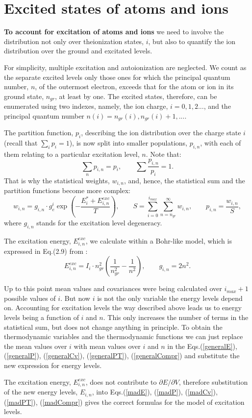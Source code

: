 \section{Excited states of atoms and ions}
{\bf To account for excitation of atoms and ions} we need to involve the
distribution not only over theionization states, $i$, but also to quantify the
ion distribution over the ground and 
excitated levels. 

For simplicity,  multiple excitation and autoionization are neglected. We
count as the separate excited levels only those ones for which the principal 
quantum number, 
$n$, of the outermost electron, exceeds that for the atom or ion in its ground state, 
$n_{gr}$, at least by one. The excited states, therefore, can be enumerated using two indexes,
namely, the ion charge, $i=0,1,2...$, and the principal quantum number 
$n(i)=n_{gr}(i),n_{gr}(i)+1,...$. 

The partition function, $p_i$, describing the ion distribution over the charge state $i$ 
(recall that $\sum_i{p_i}=1$), 
is now split into smaller populations, $p_{i,n}$, with each of them relating to a particular 
excitation level, $n$. Note that:
\begin{equation}
\sum_n{p_{i,n}}=p_i,\qquad \sum{\frac{p_{i,n}}{p_i}}=1.	
\end{equation}
That is why the statistical weights, $w_{i,n}$, and, hence, the statistical sum and the partition functions
become more complex:
\begin{equation}
w_{i,n} = g_{i,n} \cdot g_e^i \exp \left( -\frac{E^*_i + E^{exc}_{i,n}}{T} \right),\qquad
S = \sum_{i=0}^{i_{max}} \sum_{n=n_{gr}}^{\infty} w_{i,n},\qquad
p_{i,n} = \frac{w_{i,n}}{S},
\end{equation}
where $g_{i,n}$ stands for the excitation level degeneracy.

The excitation energy, $E^{exc}_{i,n}$, we calculate within a Bohr-like model, which is expressed in
Eq.(2.9) from \cite{ionmix}:
\begin{equation}
E^{exc}_{i,n} = I_i \cdot n_{gr}^2 \left( \frac1{n_{gr}^2} - \frac1{n^2} \right), \qquad
g_{i,n} = 2 n^2.
\end{equation}

Up to this point mean values and covariances were being calculated over $i_{max}+1$ possible
values of $i$. But now $i$ is not the only variable the energy levels depend on.
Accounting for excitation levels the way described above leads us to energy levels
being a function of $i$ and $n$.
This only increases the number of terms in the statistical sum, but does not change
anything in principle. To obtain the thermodynamic variables and the thermodynamic functions
we can just replace the mean values over $i$ with mean values over $i$ and $n$ in the
Eqs.(\ref{generalE}), (\ref{generalP}), (\ref{generalCv}),
(\ref{generalPT}), (\ref{generalCompr}) and substitute the new expression for energy levels.

The excitation energy, $E^{exc}_{i,n}$, does not contribute to $\partial E / \partial V$,
therefore substitution of the new energy levels, $E_{i,n}$, into
Eqs.(\ref{madE}), (\ref{madP}), (\ref{madCv}), (\ref{madPT}), (\ref{madCompr})
gives the correct formulas for the model of excitation levels.

